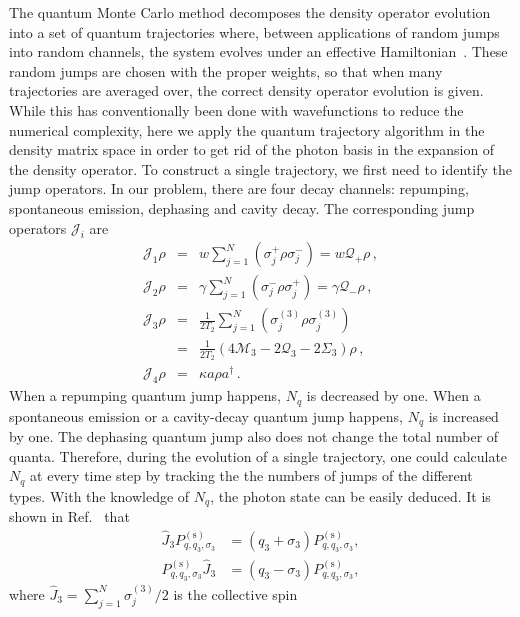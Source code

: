 \documentclass[aps,
twocolumn,
superscriptaddress,groupedaddress]{revtex4}
\begin{document}
{The quantum Monte Carlo method decomposes the density operator evolution
into a set of quantum trajectories where, between applications of random
jumps into random channels, the system evolves under an effective
Hamiltonian~\cite{Dalibard92,Dum92,Knight98}. These random jumps are chosen with the proper weights, so that when many trajectories are averaged over, the correct density operator evolution is given. While this has
conventionally been done with wavefunctions to reduce the numerical
complexity, here we apply the quantum trajectory algorithm in the
density matrix space in order to get rid of the photon basis in the
expansion of the density operator. To construct a single trajectory, we
first need to identify the jump operators. In our problem, there are
four decay channels: repumping, spontaneous emission, dephasing and
cavity decay. The corresponding jump operators $\mathcal{J}_i$ are
\begin{eqnarray}
\mathcal{J}_1\rho&=&
w\sum_{j=1}^N(\sigma_j^+\rho\sigma_j^-)=w\mathcal{Q}_{+}\rho\,,
\nonumber\\
\mathcal{J}_2\rho&=&
\gamma\sum_{j=1}^N(\sigma_j^-\rho\sigma_j^+)=
\gamma \mathcal{Q}_{-}\rho\,,\nonumber\\
\mathcal{J}_3\rho&=&
\frac{1}{2T_2}\sum_{j=1}^N(\sigma_j^{(3)}\rho\sigma_j^{(3)})
\nonumber\\
&=&\frac{1}{2T_2}(4\mathcal{M}_3-2  \mathcal{Q}_3-2\Sigma_3)\rho\,,
\nonumber\\
\mathcal{J}_4\rho&=&\kappa a\rho a^{\dagger}\,.
\label{jumpo}
\end{eqnarray}
When a repumping quantum jump happens, $N_q$ is decreased by one. When a
spontaneous emission or a cavity-decay quantum jump happens, $N_q$ is
increased by one. The dephasing quantum jump also does not change the
total number of quanta. Therefore, during the evolution of a single
trajectory, one could calculate $N_q$ at every time step by tracking the
the numbers of jumps of the different types. With the knowledge of
$N_q$, the photon state can be easily deduced. It is shown in
Ref.~\cite{PhysRevA.87.062101} that
\begin{equation}
\begin{split}
  \hat{J}_3P_{q,q_3,\sigma_3}^{(\mathrm{s})}&=
  (q_3+\sigma_3)P_{q,q_3,\sigma_3}^{(\mathrm{s})},\\
  P_{q,q_3,\sigma_3}^{(\mathrm{s})}\hat{J}_3&=
  (q_3-\sigma_3)P_{q,q_3,\sigma_3}^{(\mathrm{s})},
\end{split}
\end{equation}
where $\hat{J}_3=\sum_{j=1}^N\sigma_j^{(3)}/2$ is the collective spin
}
\end{document}

